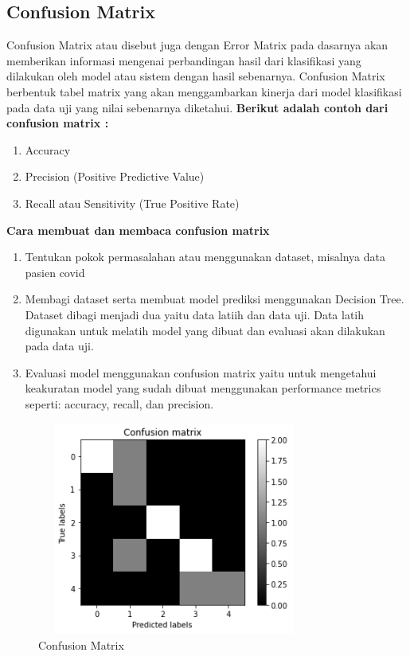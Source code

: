 	\subsection{Confusion Matrix}
	Confusion Matrix atau disebut juga dengan Error Matrix pada dasarnya akan memberikan informasi mengenai perbandingan hasil dari klasifikasi yang dilakukan oleh model atau sistem dengan hasil sebenarnya. Confusion Matrix berbentuk tabel matrix yang akan menggambarkan kinerja dari model klasifikasi pada data uji yang nilai sebenarnya diketahui.
	\newline 
	\textbf {Berikut adalah contoh dari confusion matrix :}
	\begin{enumerate}
		\item Accuracy
		\item Precision (Positive Predictive Value)
		\item Recall atau Sensitivity (True Positive Rate)
	\end{enumerate}
	\textbf {Cara membuat dan membaca confusion matrix}
	\begin{enumerate}
		\item Tentukan pokok permasalahan atau menggunakan dataset, misalnya data pasien covid
		\item Membagi dataset serta membuat model prediksi menggunakan Decision Tree. Dataset dibagi menjadi dua yaitu data latiih dan data uji. Data latih digunakan untuk melatih model yang dibuat dan evaluasi akan dilakukan pada data uji. 
		\item Evaluasi model menggunakan confusion matrix yaitu untuk mengetahui keakuratan model yang sudah dibuat menggunakan performance metrics seperti: accuracy, recall, dan precision.
	\end{enumerate}
	\begin{figure}[!htbp]
		\centering
		\includegraphics[width=9cm,height=7cm]{figures/confusion_matrix.png}
		\caption{Confusion Matrix}
		\label{penanda}
	\end{figure}

